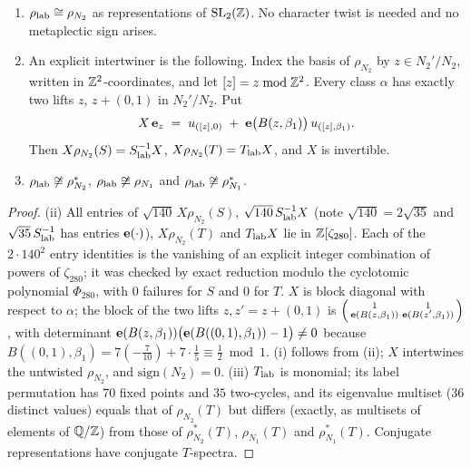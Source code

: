 \begin{theorem}\label{thm:weil8}
\begin{enumerate}[label=(\roman*)]
\item $\rho_{\rm lab}\cong\rho_{N_2}$ as representations of $\mathrm{SL}_2(\mathbb{Z})$. No character twist is needed and no metaplectic sign arises.
\item An explicit intertwiner is the following. Index the basis of $\rho_{N_2}$ by $z\in N_2'/N_2$, written in $\mathbb{Z}^2$-coordinates, and let $[z]=z\bmod\mathbb{Z}^2$. Every class $\alpha$ has exactly two lifts $z$, $z+(0,1)$ in $N_2'/N_2$. Put
\[
X\,\mathbf{e}_z\;=\;u_{([z],0)}\;+\;\mathbf{e}\big(B(z,\beta_1)\big)\,u_{([z],\beta_1)} .
\]
Then $X\rho_{N_2}(S)=S_{\rm lab}^{-1}X$, $X\rho_{N_2}(T)=T_{\rm lab}X$, and $X$ is invertible.
\item $\rho_{\rm lab}\not\cong\rho_{N_2}^*$, $\rho_{\rm lab}\not\cong\rho_{N_1}$ and $\rho_{\rm lab}\not\cong\rho_{N_1}^*$.
\end{enumerate}
\end{theorem}
\begin{proof}
(ii) All entries of $\sqrt{140}\,X\rho_{N_2}(S)$, $\sqrt{140}\,S_{\rm lab}^{-1}X$ (note $\sqrt{140}=2\sqrt{35}$ and $\sqrt{35}\,S_{\rm lab}^{-1}$ has entries $\mathbf{e}(\cdot)$), $X\rho_{N_2}(T)$ and $T_{\rm lab}X$ lie in $\mathbb{Z}[\zeta_{280}]$. Each of the $2\cdot140^2$ entry identities is the vanishing of an explicit integer combination of powers of $\zeta_{280}$; it was checked by exact reduction modulo the cyclotomic polynomial $\Phi_{280}$, with $0$ failures for $S$ and $0$ for $T$. $X$ is block diagonal with respect to $\alpha$; the block of the two lifts $z,z'=z+(0,1)$ is $\left(\begin{smallmatrix}1&1\\\mathbf{e}(B(z,\beta_1))&\mathbf{e}(B(z',\beta_1))\end{smallmatrix}\right)$, with determinant $\mathbf{e}(B(z,\beta_1))\big(\mathbf{e}(B((0,1),\beta_1))-1\big)\neq0$ because $B((0,1),\beta_1)=7(-\tfrac7{10})+7\cdot\tfrac15\equiv\tfrac12\bmod1$. (i) follows from (ii); $X$ intertwines the untwisted $\rho_{N_2}$, and $\mathrm{sign}(N_2)=0$.
(iii) $T_{\rm lab}$ is monomial; its label permutation has $70$ fixed points and $35$ two-cycles, and its eigenvalue multiset ($36$ distinct values) equals that of $\rho_{N_2}(T)$ but differs (exactly, as multisets of elements of $\mathbb{Q}/\mathbb{Z}$) from those of $\rho_{N_2}^*(T)$, $\rho_{N_1}(T)$ and $\rho_{N_1}^*(T)$. Conjugate representations have conjugate $T$-spectra.
\end{proof}
